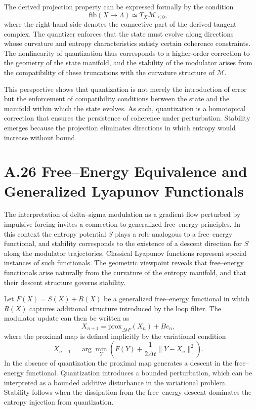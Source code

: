 The derived projection property can be expressed formally by the condition
\[
\mathrm{fib}(X \to \Lambda) \simeq T_X\mathcal{M}_{\leq 0},
\]
where the right-hand side denotes the connective part of the derived tangent complex. The quantizer enforces that the state must evolve along directions whose curvature and entropy characteristics satisfy certain coherence constraints. The nonlinearity of quantization thus corresponds to a higher-order correction to the geometry of the state manifold, and the stability of the modulator arises from the compatibility of these truncations with the curvature structure of \(\mathcal{M}\).

This perspective shows that quantization is not merely the introduction of error but the enforcement of compatibility conditions between the state and the manifold within which the state evolves. As such, quantization is a homotopical correction that ensures the persistence of coherence under perturbation. Stability emerges because the projection eliminates directions in which entropy would increase without bound.

\section{A.26 Free–Energy Equivalence and Generalized Lyapunov Functionals}

The interpretation of delta–sigma modulation as a gradient flow perturbed by impulsive forcing invites a connection to generalized free–energy principles. In this context the entropy potential \(S\) plays a role analogous to a free–energy functional, and stability corresponds to the existence of a descent direction for \(S\) along the modulator trajectories. Classical Lyapunov functions represent special instances of such functionals. The geometric viewpoint reveals that free–energy functionals arise naturally from the curvature of the entropy manifold, and that their descent structure governs stability.

Let \(F(X) = S(X) + R(X)\) be a generalized free–energy functional in which \(R(X)\) captures additional structure introduced by the loop filter. The modulator update can then be written as
\[
X_{n+1} = \mathrm{prox}_{\Delta t F}(X_n) + B e_n,
\]
where the proximal map is defined implicitly by the variational condition
\[
X_{n+1} = \arg\min_Y \left( F(Y) + \frac{1}{2\Delta t}\|Y - X_n\|^2\right).
\]
In the absence of quantization the proximal map generates a descent in the free–energy functional. Quantization introduces a bounded perturbation, which can be interpreted as a bounded additive disturbance in the variational problem. Stability follows when the dissipation from the free–energy descent dominates the entropy injection from quantization.

